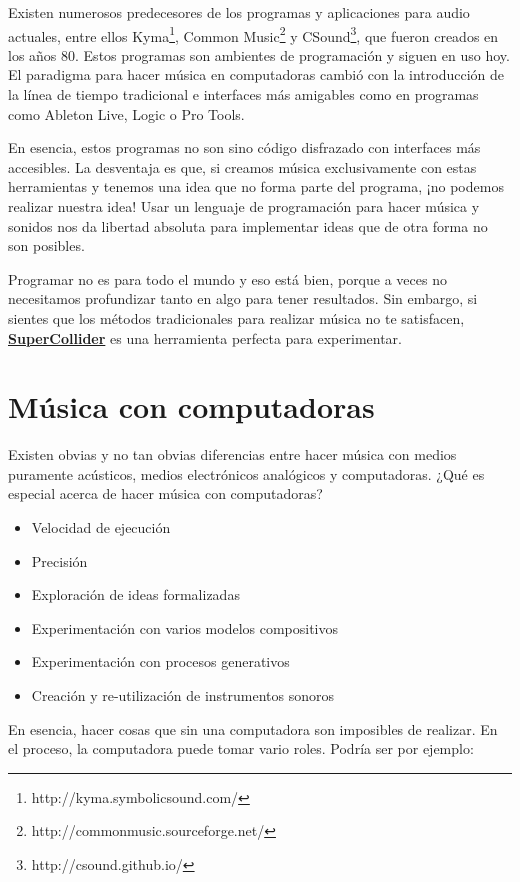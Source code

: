 Existen numerosos predecesores de los programas y aplicaciones para audio actuales, entre ellos Kyma\footnote{http://kyma.symbolicsound.com/}, Common Music\footnote{http://commonmusic.sourceforge.net/} y CSound\footnote{http://csound.github.io/}, que fueron creados en los años 80. Estos programas son ambientes de programación y siguen en uso hoy. El paradigma para hacer música en computadoras cambió con la introducción de la línea de tiempo tradicional e interfaces más amigables como en programas como Ableton Live, Logic o Pro Tools.

En esencia, estos programas no son sino código disfrazado con interfaces más accesibles. La desventaja es que, si creamos música exclusivamente con estas herramientas y tenemos una idea que no forma parte del programa, ¡no podemos realizar nuestra idea! Usar un lenguaje de programación para hacer música y sonidos nos da libertad absoluta para implementar ideas que de otra forma no son posibles. 

Programar no es para todo el mundo y eso está bien, porque a veces no necesitamos profundizar tanto en algo para tener resultados. Sin embargo, si sientes que los métodos tradicionales para realizar música no te satisfacen, \href{http://supercollider.github.io/}{\textbf{SuperCollider}} es una herramienta perfecta para experimentar.

\section{Música con computadoras}

Existen obvias y no tan obvias diferencias entre hacer música con medios puramente acústicos, medios electrónicos analógicos y computadoras. ¿Qué es especial acerca de hacer música con computadoras?

\begin{itemize}
\item Velocidad de ejecución
\item Precisión
\item Exploración de ideas formalizadas
\item Experimentación con varios modelos compositivos
\item Experimentación con procesos generativos
\item Creación y re-utilización de instrumentos sonoros
\end{itemize}

En esencia, hacer cosas que sin una computadora son imposibles de realizar. En el proceso, la computadora puede tomar vario roles. Podría ser por ejemplo:

